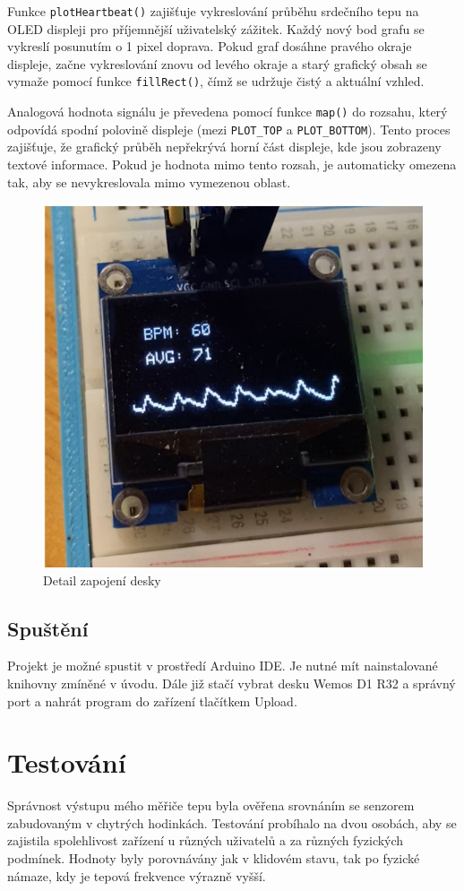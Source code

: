 \documentclass[11pt,a4paper]{article}
\begin{document}
Funkce \texttt{plotHeartbeat()} zajišťuje vykreslování průběhu srdečního tepu na OLED displeji pro příjemnější uživatelský zážitek. Každý nový bod grafu se vykreslí posunutím o 1 pixel doprava. Pokud graf dosáhne pravého okraje displeje, začne vykreslování znovu od levého okraje a starý grafický obsah se vymaže pomocí funkce \texttt{fillRect()}, čímž se udržuje čistý a aktuální vzhled.

Analogová hodnota signálu je převedena pomocí funkce \texttt{map()} do rozsahu, který odpovídá spodní polovině displeje (mezi \texttt{PLOT\_TOP} a \texttt{PLOT\_BOTTOM}). Tento proces zajišťuje, že grafický průběh nepřekrývá horní část displeje, kde jsou zobrazeny textové informace. Pokud je hodnota mimo tento rozsah, je automaticky omezena tak, aby se nevykreslovala mimo vymezenou oblast.

 \begin{figure}[ht]
    \centering
    \includegraphics[width=0.4\linewidth]{display_plot.png}
    \caption{Detail zapojení desky}
\end{figure}

\pagebreak{}

\subsection{Spuštění}

Projekt je možné spustit v prostředí Arduino IDE. Je nutné mít nainstalované knihovny zmíněné v úvodu. Dále již stačí vybrat desku Wemos D1 R32 a správný port a nahrát program do zařízení tlačítkem Upload.

\section{Testování}

Správnost výstupu mého měřiče tepu byla ověřena srovnáním se senzorem zabudovaným v chytrých hodinkách. Testování probíhalo na dvou osobách, aby se zajistila spolehlivost zařízení u různých uživatelů a za různých fyzických podmínek. Hodnoty byly porovnávány jak v klidovém stavu, tak po fyzické námaze, kdy je tepová frekvence výrazně vyšší.
\end{document}
